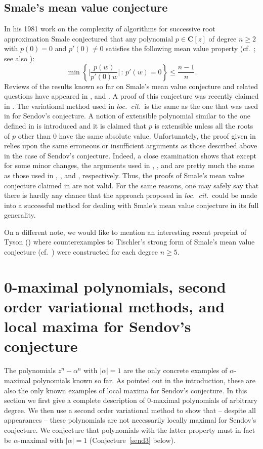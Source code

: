 \documentclass[10pt,twoside,a4paper,reqno]{amsart}
\theoremstyle{plain}
\theoremstyle{definition}
\begin{document}
{\subsection{Smale's mean value conjecture} In his 1981 work on the complexity 
of algorithms for successive 
root approximation Smale conjectured that any polynomial 
$p\in \mathbf{C}[z]$ of degree 
$n\ge 2$ with $p(0)=0$ and $p'(0)\neq 0$ satisfies the following mean value 
property 
(cf.~\cite[Problem 1E]{Sm}; see also \cite{Sm1}):
$$\min\left\{\bigg|\frac{p(w)}{p'(0)w}\bigg|\,:\,p'(w)=0\right\}\le 
\frac{n-1}{n}.$$
Reviews of the results known so far on Smale's mean value conjecture and 
related questions have appeared in  \cite{RS}, \cite{Sc} and \cite{Sh}.
A proof of this conjecture was recently claimed in \cite{S2}. The variational 
method used in {\em loc.~cit.~}is the same as the one that 
was used in \cite{S1} for Sendov's conjecture. A notion of extensible 
polynomial similar to the one defined in \cite{S1} 
is introduced and it is claimed that $p$ is extensible unless all the roots 
of $p$ other than 0 have the same absolute value. Unfortunately, the proof 
given in \cite{S2} relies 
upon the same erroneous or insufficient arguments as those described above in 
the case of Sendov's conjecture. Indeed, a close examination shows that 
except for some minor changes, the arguments used in \cite[v1-v3]{S2}, 
\cite[v4-v5]{S2}, \cite[v6-v7]{S2} and \cite[v8]{S2} are 
pretty much the same as those used in \cite[v1-v2]{S1}, \cite[v3-v5]{S1}, 
\cite[v6-v7]{S1} and 
\cite[v8]{S1}, respectively. Thus, the proofs of Smale's mean value conjecture
claimed in \cite[v1-v8]{S2} are not valid. For the same reasons, one may 
safely say that there is hardly any chance that the approach proposed in 
{\em loc.~cit.~}could be made into a successful method for dealing with 
Smale's mean value conjecture in its full generality.

On a different note, we would like to mention an interesting recent preprint 
of Tyson (\cite{Ty}) where counterexamples to Tischler's strong form of 
Smale's mean value conjecture (cf.~\cite{Ti}) were constructed for each degree 
$n\ge 5$.

\section{0-maximal polynomials, second order variational methods, and local 
maxima for Sendov's conjecture}

The polynomials $z^n-\alpha^n$ with $|\alpha|=1$ are the only concrete 
examples of $\alpha$-maximal polynomials known so far. As pointed out in the 
introduction, these are also the only known examples of local maxima  
for Sendov's conjecture. In this section we
first give a complete description of 0-maximal 
polynomials of arbitrary degree. We then use a second order 
variational method to show that -- despite all appearances -- 
these polynomials are not necessarily locally maximal for Sendov's conjecture.
We conjecture that polynomials with the latter property must in fact be 
$\alpha$-maximal with $|\alpha|=1$ (Conjecture~\ref{send3} below).

}
\end{document}
